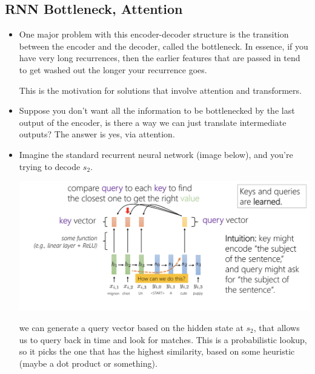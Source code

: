 \subsection{RNN Bottleneck, Attention}
\begin{itemize}
	\item One major problem with this encoder-decoder structure is the transition
		between the encoder and the decoder, called the bottleneck. In essence, if
		you have very long recurrences, then the earlier features that are passed in
		tend to get washed out the longer your recurrence goes. 

		This is the motivation for solutions that involve attention and transformers.
	\item Suppose you don't want all the information to be bottlenecked by the last
		output of the encoder, is there a way we can just translate intermediate
		outputs? The answer is yes, via attention. 
	\item Imagine the standard recurrent neural network (image below), and 
		you're trying to decode \( s_2 \). 
		\begin{center}
			\includegraphics[scale=0.5]{images/lec11-3.png}
		\end{center}
		we can generate a query vector based on the hidden state at \( s_2 \), that
		allows us to query back in time and look for matches. This is a probabilistic
		lookup, so it picks the one that has the highest similarity, based on some
		heuristic (maybe a dot product or something).     


\end{itemize}
